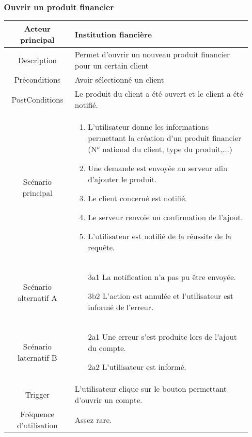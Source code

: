 \documentclass{article}
\begin{document}
\subsubsection{Ouvrir un produit financier}
\begin{table}[h]
   \begin{tabular}{|c|p{10cm}|}
      \hline
      Acteur principal&Institution fiancière\\
      \hline
      Description&Permet d'ouvrir un nouveau produit financier pour un certain client\\
      \hline
      Préconditions&Avoir sélectionné un client\\
      \hline
      PostConditions&Le produit du client a été ouvert et le client a été notifié.\\
      \hline
      Scénario principal& 
            \begin{enumerate}
               \item L'utilisateur donne les informations permettant la création d'un produit financier (N° national du client, type du produit,...)
               \item Une demande est envoyée au serveur afin d'ajouter le produit.
               \item Le client concerné est notifié.
               \item Le serveur renvoie un confirmation de l'ajout.
               \item L'utilisateur est notifié de la réussite de la requête.
            \end{enumerate}     \\
      \hline
      Scénario alternatif A&
            \begin{itemize}
               \item[3a1] La notification n'a pas pu être envoyée.
               \item[3b2] L'action est annulée et l'utilisateur est informé de l'erreur. 
            \end{itemize}\\
      \hline
      Scénario laternatif B&
            \begin{itemize}
               \item[2a1] Une erreur s'est produite lors de l'ajout du compte.
               \item[2a2] L'utilisateur est informé.  
            \end{itemize}\\
      \hline
      Trigger&L'utilisateur clique sur le bouton permettant d'ouvrir un compte.\\
      \hline
      Fréquence d'utilisation&Assez rare.\\
      \hline
   \end{tabular}
\end{table}
\end{document}

